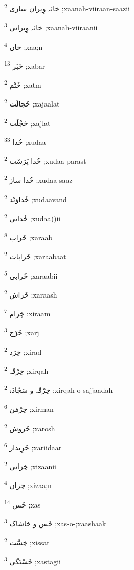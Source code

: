 \documentclass[12pt]{article}
\begin{document}
\begin{RTL}
\begin{multicols}{5}
{\ur خانَہ وِیران سازی}   \textsuperscript{2} ;xaanah-viiraan-saazii

{\ur خانَہ وِیرانی}   \textsuperscript{3} ;xaanah-viiraanii

{\ur خاں}   \textsuperscript{4} ;xaa;n

{\ur خَبَر}   \textsuperscript{13} ;xabar

{\ur خَتْم}   \textsuperscript{2} ;xatm

{\ur خَجالَت}   \textsuperscript{2} ;xajaalat

{\ur خَجْلَت}   \textsuperscript{2} ;xajlat

{\ur خُدا}   \textsuperscript{33} ;xudaa

{\ur خُدا پَرَسْت}   \textsuperscript{2} ;xudaa-parast

{\ur خُدا ساز}   \textsuperscript{2} ;xudaa-saaz

{\ur خُداوَنْد}   \textsuperscript{2} ;xudaavand

{\ur خُدائی}   \textsuperscript{2} ;xudaa))ii

{\ur خَراب}   \textsuperscript{8} ;xaraab

{\ur خَرابات}   \textsuperscript{2} ;xaraabaat

{\ur خَرابی}   \textsuperscript{5} ;xaraabii

{\ur خَراش}   \textsuperscript{2} ;xaraash

{\ur خِرام}   \textsuperscript{7} ;xiraam

{\ur خَرْج}   \textsuperscript{3} ;xarj

{\ur خِرَد}   \textsuperscript{2} ;xirad

{\ur خِرْقَہ}   \textsuperscript{2} ;xirqah

{\ur خِرْقَہ و سَجّادَہ}   \textsuperscript{2} ;xirqah-o-sajjaadah

{\ur خِرْمَن}   \textsuperscript{6} ;xirman

{\ur خَروش}   \textsuperscript{2} ;xarosh

{\ur خَرِیدار}   \textsuperscript{6} ;xariidaar

{\ur خِزانی}   \textsuperscript{2} ;xizaanii

{\ur خِزاں}   \textsuperscript{4} ;xizaa;n

{\ur خَس}   \textsuperscript{14} ;xas

{\ur خَس و خاشاک}   \textsuperscript{3} ;xas-o-;xaashaak

{\ur خِسَّت}   \textsuperscript{2} ;xissat

{\ur خَسْتَگی}   \textsuperscript{3} ;xastagii


\end{multicols}
\end{RTL}
\end{document}
